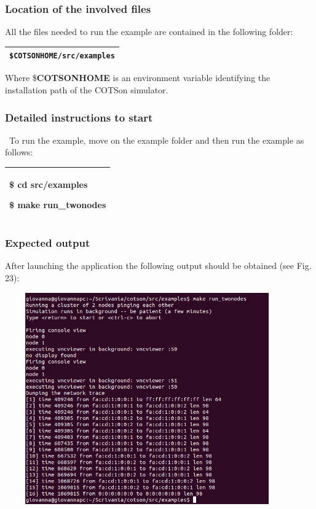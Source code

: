 \documentclass[a4paper]{article}
\begin{document}
\subsubsection[Location of the involved files]{\rmfamily Location of the
involved files}
{
All the files needed to run the example are contained in the following
folder:}

\begin{flushleft}
\tablehead{}
\begin{supertabular}{|m{6.21846in}|}
\hline
{}
\texttt{\$COTSONHOME}\foreignlanguage{english}{\texttt{/src/examples}}\\\hline
\end{supertabular}
\end{flushleft}
{
Where \$\textbf{COTSONHOME }is an environment variable identifying the
installation path of the COTSon simulator.}

\subsubsection[Detailed instructions to start]{\rmfamily Detailed
instructions to start}
{
\ To run the example, move on the example folder and then run the
example as follows:}

\begin{flushleft}
\tablehead{}
\begin{supertabular}{|m{6.21846in}|}
\hline
{\ttfamily \$ cd src/examples}

\ttfamily \$ make run\_twonodes\\\hline
\end{supertabular}
\end{flushleft}
\subsubsection[Expected output]{\rmfamily Expected output}
{
After launching the application the following output should be obtained
(see Fig. 23):}

{\centering 
\includegraphics[width=4.8071in,height=3.5917in]{img39.png}
\par}
\end{document}
